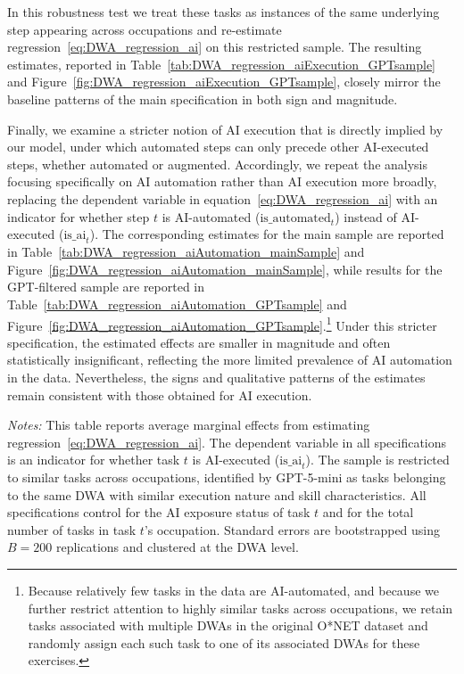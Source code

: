 In this robustness test we treat these tasks as instances of the same underlying step appearing across occupations and re-estimate regression~\eqref{eq:DWA_regression_ai} on this restricted sample.
The resulting estimates, reported in Table~\ref{tab:DWA_regression_aiExecution_GPTsample} and Figure~\ref{fig:DWA_regression_aiExecution_GPTsample}, closely mirror the baseline patterns of the main specification in both sign and magnitude.

Finally, we examine a stricter notion of AI execution that is directly implied by our model, under which automated steps can only precede other AI-executed steps, whether automated or augmented.
Accordingly, we repeat the analysis focusing specifically on AI automation rather than AI execution more broadly, replacing the dependent variable in equation~\eqref{eq:DWA_regression_ai} with an indicator for whether step $t$ is AI-automated ($\text{is\_automated}_{t}$) instead of AI-executed ($\text{is\_ai}_{t}$).
The corresponding estimates for the main sample are reported in Table~\ref{tab:DWA_regression_aiAutomation_mainSample} and Figure~\ref{fig:DWA_regression_aiAutomation_mainSample}, while results for the GPT-filtered sample are reported in Table~\ref{tab:DWA_regression_aiAutomation_GPTsample} and Figure~\ref{fig:DWA_regression_aiAutomation_GPTsample}.\footnote{
Because relatively few tasks in the data are AI-automated, and because we further restrict attention to highly similar tasks across occupations, we retain tasks associated with multiple DWAs in the original O*NET dataset and randomly assign each such task to one of its associated DWAs for these exercises.
}
Under this stricter specification, the estimated effects are smaller in magnitude and often statistically insignificant, reflecting the more limited prevalence of AI automation in the data. Nevertheless, the signs and qualitative patterns of the estimates remain consistent with those obtained for AI execution.


\begin{table}[ht!]
\begin{center}
\caption{Effect of Neighboring Tasks' AI Execution Status on Task's AI Execution Likelihood (GPT-filtered Sample)}
\label{tab:DWA_regression_aiExecution_GPTsample}
\resizebox{\textwidth}{!}{

}
\end{center}
\footnotesize{\emph{Notes:}} 
This table reports average marginal effects from estimating regression~\eqref{eq:DWA_regression_ai}.  
The dependent variable in all specifications is an indicator for whether task $t$ is AI-executed ($\text{is\_ai}_{t}$).  
The sample is restricted to similar tasks across occupations, identified by GPT-5-mini as tasks belonging to the same DWA with similar execution nature and skill characteristics.  
All specifications control for the AI exposure status of task $t$ and for the total number of tasks in task $t$'s occupation.
Standard errors are bootstrapped using $B=200$ replications and clustered at the DWA level.  
\end{table}

